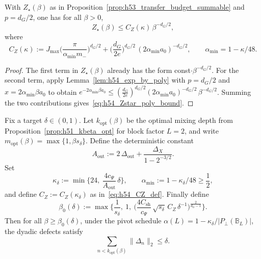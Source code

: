 \begin{corollary}
\label{cor:h54_Zstar_poly}
With $Z_\star(\beta)$ as in Proposition~\ref{prop:h53_transfer_budget_summable} and $p=d_G/2$, one has for all $\beta>0$,
\begin{equation}
\label{eq:h54_Zstar_poly_bound}
 Z_\star(\beta)\le C_Z(\kappa)\,\beta^{-d_G/2},
\end{equation}
where
\begin{equation}
\label{eq:h54_CZ_def}
C_Z(\kappa)
:=
J_{\max}\Big(\frac{\pi}{\alpha_{\min} m_-}\Big)^{d_G/2}
+
\Big(\frac{d_G}{2e}\Big)^{d_G/2}\,(2\alpha_{\min} a_0)^{-d_G/2},
\qquad \alpha_{\min}=1-\kappa/48.
\end{equation}
\end{corollary}

\begin{proof}
The first term in $Z_\star(\beta)$ already has the form const$\cdot \beta^{-d_G/2}$.
For the second term, apply Lemma~\ref{lem:h54_exp_by_poly} with $p=d_G/2$ and $x=2\alpha_{\min}\beta a_0$ to obtain
$e^{-2\alpha_{\min}\beta a_0}\le (\frac{d_G}{2e})^{d_G/2}(2\alpha_{\min}a_0)^{-d_G/2}\,\beta^{-d_G/2}$.
Summing the two contributions gives~\eqref{eq:h54_Zstar_poly_bound}.
\end{proof}

\begin{proposition}
\label{prop:h54_transfer_feasible}
Fix a target $\delta\in(0,1)$.
Let $k_{\mathrm{opt}}(\beta)$ be the optimal mixing depth from Proposition~\ref{prop:h51_kbeta_opt}
for block factor $L=2$, and write $m_{\mathrm{opt}}(\beta)=\max\{1,\beta s_{\delta}\}$.
Define the deterministic constant
\begin{equation}
\label{eq:h54_Aout_def}
A_{\mathrm{out}}:=2\,\Delta_{\mathrm{out}}+\frac{\Delta_X}{1-2^{-3/2}}.
\end{equation}
Set
\begin{equation}
\label{eq:h54_kappa_delta_def}
\kappa_{\delta}:=\min\Big\{24,\ \frac{4 c_\Psi}{A_{\mathrm{out}}}\,\delta\Big\},
\qquad \alpha_{\min}:=1-\kappa_{\delta}/48\ge \frac12,
\end{equation}
and define $C_Z:=C_Z(\kappa_{\delta})$ as in~\eqref{eq:h54_CZ_def}.
Finally define
\begin{equation}
\label{eq:h54_beta0_def}
\beta_0(\delta)
:=
\max\Bigg\{\frac{1}{s_{\delta}},\ 1,\ \Big(\frac{4 C_{\mathrm{sh}}}{c_\Psi}\,\sqrt{s_{\delta}}\,C_Z\,\delta^{-1}\Big)^{\!\frac{2}{d_G-1}}\Bigg\}.
\end{equation}
Then for all $\beta\ge \beta_0(\delta)$, under the pivot schedule
$\alpha(L)=1-\kappa_{\delta}/|P_\perp(\mathbb B_L)|$, the dyadic defects satisfy
\begin{equation}
\label{eq:h54_transfer_sum_le_delta}
\sum_{n<k_{\mathrm{opt}}(\beta)}\|\Delta_n\|_2 \le \delta.
\end{equation}
\end{proposition}

